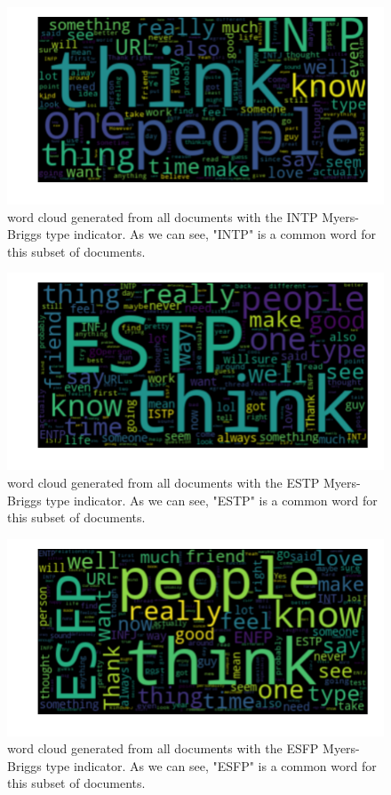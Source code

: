 \begin{figure}[htp] 
  \caption{word cloud generated from all documents with the INTP Myers-Briggs type indicator. As we can see, "INTP" is a common word for this subset of documents.}
  \label{fig:wordcloud-INTP}
  \includegraphics[scale=0.65]{wordclouds/wordcloud_INTP.pdf}
\end{figure}

\begin{figure}[htp] 
  \caption{word cloud generated from all documents with the ESTP Myers-Briggs type indicator. As we can see, "ESTP" is a common word for this subset of documents.}
  \label{fig:wordcloud-ESTP}
  \includegraphics[scale=0.65]{wordclouds/wordcloud_ESTP.pdf}
\end{figure}

\begin{figure}[htp] 
  \caption{word cloud generated from all documents with the ESFP Myers-Briggs type indicator. As we can see, "ESFP" is a common word for this subset of documents.}
  \label{fig:wordcloud-ESFP}
  \includegraphics[scale=0.65]{wordclouds/wordcloud_ESFP.pdf}
\end{figure}

